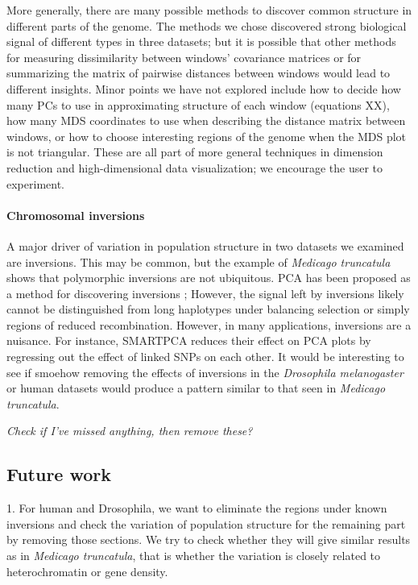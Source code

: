 \documentclass[11pt, oneside]{article}   	%
\newcommand{\plr}[1]{{\em \color{blue} #1}}
\begin{document}
More generally, there are many possible methods to discover common structure in different parts of the genome.
The methods we chose discovered strong biological signal of different types in three datasets;
but it is possible that other methods for measuring dissimilarity between windows' covariance matrices
or for summarizing the matrix of pairwise distances between windows
would lead to different insights.
Minor points we have not explored include how to decide how many PCs to use in approximating structure of each window
(equations XX),
how many MDS coordinates to use when describing the distance matrix between windows,
or how to choose interesting regions of the genome when the MDS plot is not triangular.
These are all part of more general techniques in dimension reduction and high-dimensional data visualization;
we encourage the user to experiment.


\paragraph{Chromosomal inversions}
A major driver of variation in population structure in two datasets we examined are inversions.
This may be common,
but the example of \textit{Medicago truncatula} shows that polymorphic inversions are not ubiquitous.
PCA has been proposed as a method for discovering inversions \citep{ma2012investigation};
However, the signal left by inversions likely cannot be distinguished from long haplotypes under balancing selection 
or simply regions of reduced recombination.
However, in many applications, inversions are a nuisance.
For instance, SMARTPCA \citep{patterson2006population} reduces their effect on PCA plots
by regressing out the effect of linked SNPs on each other.
It would be interesting to see if smoehow removing the effects of inversions in the \textit{Drosophila melanogaster} or human datasets
would produce a pattern similar to that seen in \textit{Medicago truncatula}.

\plr{Check if I've missed anything, then remove these?}

\subsection{Future work}
1. For human and Drosophila, we want to eliminate the regions under known inversions and check the variation of population structure for the remaining part by removing those sections. We try to check whether they will give similar results as in \textit{Medicago truncatula}, that is whether the variation is closely related to heterochromatin or gene density.
\end{document}
